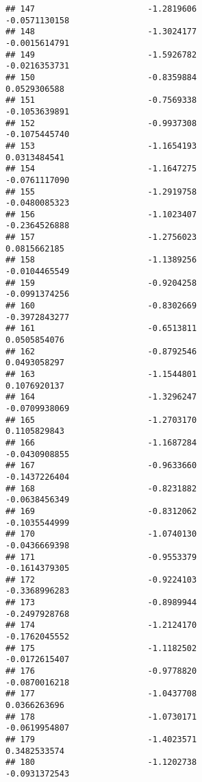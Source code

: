 \documentclass[
]{article}
\begin{document}
\begin{verbatim}
## 147                       -1.2819606                         -0.0571130158
## 148                       -1.3024177                         -0.0015614791
## 149                       -1.5926782                         -0.0216353731
## 150                       -0.8359884                          0.0529306588
## 151                       -0.7569338                         -0.1053639891
## 152                       -0.9937308                         -0.1075445740
## 153                       -1.1654193                          0.0313484541
## 154                       -1.1647275                         -0.0761117090
## 155                       -1.2919758                         -0.0480085323
## 156                       -1.1023407                         -0.2364526888
## 157                       -1.2756023                          0.0815662185
## 158                       -1.1389256                         -0.0104465549
## 159                       -0.9204258                         -0.0991374256
## 160                       -0.8302669                         -0.3972843277
## 161                       -0.6513811                          0.0505854076
## 162                       -0.8792546                          0.0493058297
## 163                       -1.1544801                          0.1076920137
## 164                       -1.3296247                         -0.0709938069
## 165                       -1.2703170                          0.1105829843
## 166                       -1.1687284                         -0.0430908855
## 167                       -0.9633660                         -0.1437226404
## 168                       -0.8231882                         -0.0638456349
## 169                       -0.8312062                         -0.1035544999
## 170                       -1.0740130                         -0.0436669398
## 171                       -0.9553379                         -0.1614379305
## 172                       -0.9224103                         -0.3368996283
## 173                       -0.8989944                         -0.2497928768
## 174                       -1.2124170                         -0.1762045552
## 175                       -1.1182502                         -0.0172615407
## 176                       -0.9778820                         -0.0870016218
## 177                       -1.0437708                          0.0366263696
## 178                       -1.0730171                         -0.0619954807
## 179                       -1.4023571                          0.3482533574
## 180                       -1.1202738                         -0.0931372543

\end{verbatim}
\end{document}

